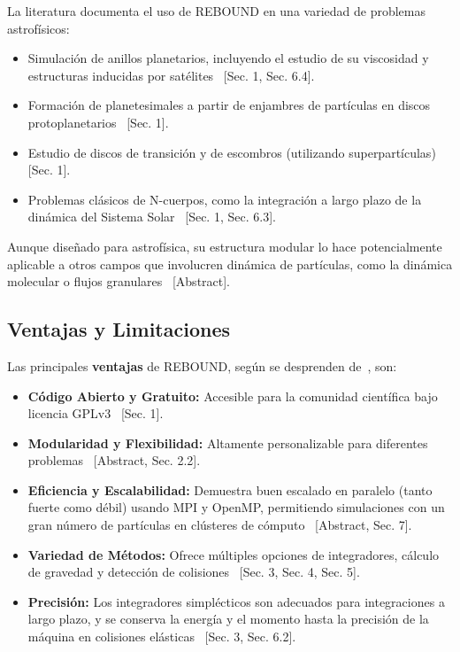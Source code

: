 La literatura documenta el uso de REBOUND en una variedad de problemas astrofísicos:
\begin{itemize}
    \item Simulación de anillos planetarios, incluyendo el estudio de su viscosidad y estructuras inducidas por satélites~\cite{Rein2012} [Sec. 1, Sec. 6.4].
    \item Formación de planetesimales a partir de enjambres de partículas en discos protoplanetarios~\cite{Rein2012} [Sec. 1].
    \item Estudio de discos de transición y de escombros (utilizando superpartículas)~\cite{Rein2012} [Sec. 1].
    \item Problemas clásicos de N-cuerpos, como la integración a largo plazo de la dinámica del Sistema Solar~\cite{Rein2012} [Sec. 1, Sec. 6.3].
\end{itemize}
Aunque diseñado para astrofísica, su estructura modular lo hace potencialmente aplicable a otros campos que involucren dinámica de partículas, como la dinámica molecular o flujos granulares~\cite{Rein2012} [Abstract].

\subsection{Ventajas y Limitaciones}

Las principales \textbf{ventajas} de REBOUND, según se desprenden de~\cite{Rein2012}, son:
\begin{itemize}
    \item \textbf{Código Abierto y Gratuito:} Accesible para la comunidad científica bajo licencia GPLv3~\cite{Rein2012} [Sec. 1].
    \item \textbf{Modularidad y Flexibilidad:} Altamente personalizable para diferentes problemas~\cite{Rein2012} [Abstract, Sec. 2.2].
    \item \textbf{Eficiencia y Escalabilidad:} Demuestra buen escalado en paralelo (tanto fuerte como débil) usando MPI y OpenMP, permitiendo simulaciones con un gran número de partículas en clústeres de cómputo~\cite{Rein2012} [Abstract, Sec. 7].
    \item \textbf{Variedad de Métodos:} Ofrece múltiples opciones de integradores, cálculo de gravedad y detección de colisiones~\cite{Rein2012} [Sec. 3, Sec. 4, Sec. 5].
    \item \textbf{Precisión:} Los integradores simplécticos son adecuados para integraciones a largo plazo, y se conserva la energía y el momento hasta la precisión de la máquina en colisiones elásticas~\cite{Rein2012} [Sec. 3, Sec. 6.2].
\end{itemize}

